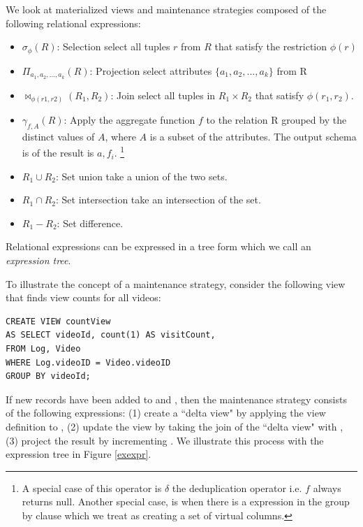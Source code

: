 We look at materialized views and maintenance strategies composed of the following relational expressions:
\begin{itemize}[noitemsep,leftmargin=*]
\item $\sigma_{\phi}(R)$: Selection select all tuples $r$ from $R$ that satisfy the restriction $\phi (r)$ 
\item $\Pi_{a_1,a_2,...,a_k}(R)$: Projection select attributes $\{a_1,a_2,...,a_k\}$ from R
\item $\bowtie_{\phi (r1,r2)}(R_1,R_2)$: Join select all tuples in $R_1 \times R_2$ that satisfy $\phi (r_1,r_2)$.
\item $\gamma_{f,A}(R)$: Apply the aggregate function $f$ to the relation R grouped by the distinct values of $A$, where $A$ is a subset of the attributes. The output schema is of the result is $a, f_i$. \footnote{A special case of this operator is $\delta$ the deduplication operator i.e. $f$ always returns null. Another special case, is when there is a expression in the group by clause which we treat as creating a set of virtual columns.}
\item $R_1 \cup R_2$: Set union take a union of the two sets.
\item $R_1 \cap R_2$: Set intersection take an intersection of the set.
\item $R_1 - R_2$: Set difference.
\end{itemize}
Relational expressions can be expressed in a tree form which we call an \emph{expression tree}.

To illustrate the concept of a maintenance strategy, consider the following view that finds view counts for all videos: 
\begin{lstlisting} 
CREATE VIEW countView
AS SELECT videoId, count(1) AS visitCount,
FROM Log, Video
WHERE Log.videoID = Video.videoID
GROUP BY videoId;
\end{lstlisting}
If new records have been added to  and , then the maintenance strategy consists of the following expressions: (1) create a ``delta view" by applying the view definition to , (2) update the view by taking the join of the ``delta view" with , (3) project the result by incrementing . We illustrate this process with the expression tree in Figure \ref{exexpr}.

